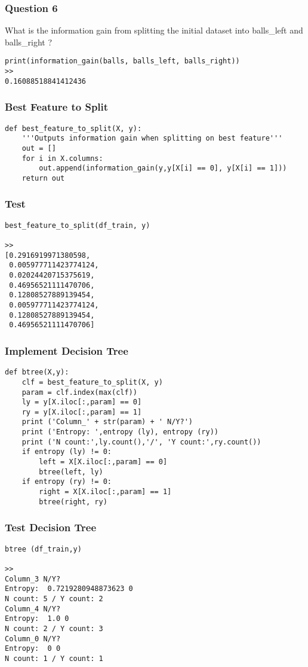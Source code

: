 \begin{frame}[fragile]\frametitle{Question 6}	
What is the information gain from splitting the initial dataset into balls\_left and balls\_right ?
\begin{lstlisting}
print(information_gain(balls, balls_left, balls_right))	
>>
0.16088518841412436
\end{lstlisting}

\end{frame}

\begin{frame}[fragile]\frametitle{Best Feature to Split}	
\begin{lstlisting}
def best_feature_to_split(X, y):
    '''Outputs information gain when splitting on best feature'''
    out = []
    for i in X.columns:
        out.append(information_gain(y,y[X[i] == 0], y[X[i] == 1]))
    return out 
\end{lstlisting}

\end{frame}

\begin{frame}[fragile]\frametitle{Test}	
\begin{lstlisting}
best_feature_to_split(df_train, y)

>>
[0.2916919971380598,
 0.005977711423774124,
 0.02024420715375619,
 0.46956521111470706,
 0.12808527889139454,
 0.005977711423774124,
 0.12808527889139454,
 0.46956521111470706]
\end{lstlisting}

\end{frame}

\begin{frame}[fragile]\frametitle{Implement Decision Tree}	
\begin{lstlisting}
def btree(X,y):
    clf = best_feature_to_split(X, y)
    param = clf.index(max(clf))
    ly = y[X.iloc[:,param] == 0]
    ry = y[X.iloc[:,param] == 1]
    print ('Column_' + str(param) + ' N/Y?')
    print ('Entropy: ',entropy (ly), entropy (ry))
    print ('N count:',ly.count(),'/', 'Y count:',ry.count())
    if entropy (ly) != 0:
        left = X[X.iloc[:,param] == 0]
        btree(left, ly)
    if entropy (ry) != 0:
        right = X[X.iloc[:,param] == 1]
        btree(right, ry)
\end{lstlisting}

\end{frame}

\begin{frame}[fragile]\frametitle{Test Decision Tree}	
\begin{lstlisting}
btree (df_train,y)

>>
Column_3 N/Y?
Entropy:  0.7219280948873623 0
N count: 5 / Y count: 2
Column_4 N/Y?
Entropy:  1.0 0
N count: 2 / Y count: 3
Column_0 N/Y?
Entropy:  0 0
N count: 1 / Y count: 1
\end{lstlisting}

\end{frame}